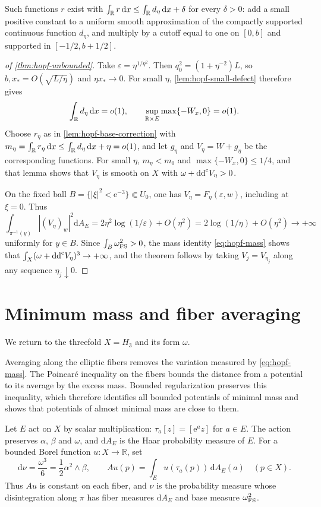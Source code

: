 Such functions $r$ exist with $\int_\mathbb R r\,\mathrm{d}x\leq\int_\mathbb R d_\eta\,\mathrm{d}x+\delta$ for every $\delta>0$: add a small positive constant to a uniform smooth approximation of the compactly supported continuous function $d_\eta$, and multiply by a cutoff equal to one on $[0,b]$ and supported in $[-1/2,b+1/2]$.

\begin{proof}[of \cref{thm:hopf-unbounded}]
Take $\varepsilon=\eta^{1/\eta^2}$. Then $q_0^2=(1+\eta^{-2})L$, so $b,x_*=O(\sqrt{L/\eta})$ and $\eta x_*\to0$. For small $\eta$, \cref{lem:hopf-small-defect} therefore gives
\[
 \int_\mathbb R d_\eta\,\mathrm{d}x=o(1),\qquad
 \sup_{\mathbb R\times E}\max\{-W_x,0\}=o(1).
\]
Choose $r_\eta$ as in \cref{lem:hopf-base-correction} with $m_\eta=\int_\mathbb R r_\eta\,\mathrm{d}x\leq\int_\mathbb R d_\eta\,\mathrm{d}x+\eta=o(1)$, and let $g_\eta$ and $V_\eta=W+g_\eta$ be the corresponding functions. For small $\eta$, $m_\eta<m_0$ and $\max\{-W_x,0\}\leq1/4$, and that lemma shows that $V_\eta$ is smooth on $X$ with $\omega+\mathrm{dd}^{\mathrm{c}} V_\eta>0$.

On the fixed ball $B=\{|\xi|^2<\mathrm{e}^{-3}\}\Subset U_0$, one has
$V_\eta=F_\eta(\varepsilon,w)$, including at $\xi=0$. Thus
\[
 \int_{\pi^{-1}(y)}|(V_\eta)_w|^2\mathrm{d}A_E
 =2\eta^2\log(1/\varepsilon)+O(\eta^2)
 =2\log(1/\eta)+O(\eta^2)\longrightarrow+\infty
\]
uniformly for $y\in B$. Since $\int_B\omega_{\mathrm{FS}}^2>0$, the mass identity \eqref{eq:hopf-mass} shows that $\int_X(\omega+\mathrm{dd}^{\mathrm{c}} V_\eta)^3\to+\infty$, and the theorem follows by taking $V_j=V_{\eta_j}$ along any sequence $\eta_j\downarrow0$.
\end{proof}



\section{Minimum mass and fiber averaging}

We return to the threefold $X=H_3$ and its form $\omega$.

Averaging along the elliptic fibers removes the variation measured by \eqref{eq:hopf-mass}. The Poincar\'e inequality on the fibers bounds the distance from a potential to its average by the excess mass. Bounded regularization preserves this inequality, which therefore identifies all bounded potentials of minimal mass and shows that potentials of almost minimal mass are close to them.

Let $E$ act on $X$ by scalar multiplication: $\tau_a[z]=[\mathrm{e}^a z]$ for $a\in E$. The action preserves $\alpha$, $\beta$ and $\omega$, and $\mathrm{d}A_E$ is the Haar probability measure of $E$. For a bounded Borel function $u\colon X\to\mathbb R$, set
\[
 \mathrm{d}\nu=\frac{\omega^3}{6}=\frac12\alpha^2\wedge\beta,
 \qquad
 Au(p)=\int_Eu(\tau_a(p))\,\mathrm{d}A_E(a)
 \quad(p\in X).
\]
Thus $Au$ is constant on each fiber, and $\nu$ is the probability measure whose disintegration along $\pi$ has fiber measures $\mathrm{d}A_E$ and base measure $\omega_{\mathrm{FS}}^2$.

